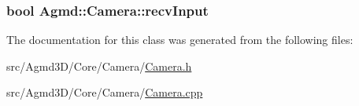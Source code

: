 \hypertarget{class_agmd_1_1_camera_aa06d1912cbdce2bd879ba977634c5014}{
\subsubsection[{recv\+Input}]{\setlength{\rightskip}{0pt plus 5cm}bool Agmd\+::\+Camera\+::recv\+Input\hspace{0.3cm}{\ttfamily [protected]}}}\label{class_agmd_1_1_camera_aa06d1912cbdce2bd879ba977634c5014}


The documentation for this class was generated from the following files\+:\begin{DoxyCompactItemize}
\item 
src/\+Agmd3\+D/\+Core/\+Camera/\hyperlink{_camera_8h}{Camera.\+h}\item 
src/\+Agmd3\+D/\+Core/\+Camera/\hyperlink{_camera_8cpp}{Camera.\+cpp}\end{DoxyCompactItemize}
